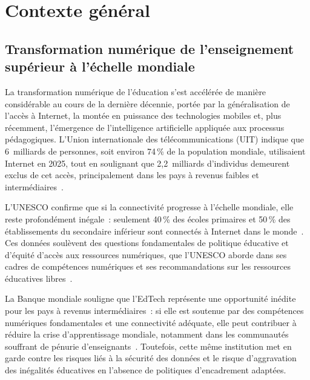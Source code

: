\section{Contexte g\'en\'eral}
\label{sec:contexte}

\subsection{Transformation num\'erique de l'enseignement sup\'erieur \`a l'\'echelle mondiale}

La transformation num\'erique de l'\'education s'est acc\'el\'er\'ee de mani\`ere consid\'erable au cours de la derni\`ere d\'ecennie, port\'ee par la g\'en\'eralisation de l'acc\`es \`a Internet, la mont\'ee en puissance des technologies mobiles et, plus r\'ecemment, l'\'emergence de l'intelligence artificielle appliqu\'ee aux processus p\'edagogiques. L'Union internationale des t\'el\'ecommunications (UIT) indique que 6~milliards de personnes, soit environ 74\,\% de la population mondiale, utilisaient Internet en 2025, tout en soulignant que 2,2~milliards d'individus demeurent exclus de cet acc\`es, principalement dans les pays \`a revenus faibles et interm\'ediaires~\cite{itu_facts_2025}.

L'UNESCO confirme que si la connectivit\'e progresse \`a l'\'echelle mondiale, elle reste profond\'ement in\'egale~: seulement 40\,\% des \'ecoles primaires et 50\,\% des \'etablissements du secondaire inf\'erieur sont connect\'es \`a Internet dans le monde~\cite{unesco_gem_2023}. Ces donn\'ees soul\`event des questions fondamentales de politique \'educative et d'\'equit\'e d'acc\`es aux ressources num\'eriques, que l'UNESCO aborde dans ses cadres de comp\'etences num\'eriques et ses recommandations sur les ressources \'educatives libres~\cite{unesco_oer_2019,unesco_digital_2026}.

La Banque mondiale souligne que l'EdTech repr\'esente une opportunit\'e in\'edite pour les pays \`a revenus interm\'ediaires~: si elle est soutenue par des comp\'etences num\'eriques fondamentales et une connectivit\'e ad\'equate, elle peut contribuer \`a r\'eduire la crise d'apprentissage mondiale, notamment dans les communaut\'es souffrant de p\'enurie d'enseignants~\cite{worldbank_edtech_2026}. Toutefois, cette m\^eme institution met en garde contre les risques li\'es \`a la s\'ecurit\'e des donn\'ees et le risque d'aggravation des in\'egalit\'es \'educatives en l'absence de politiques d'encadrement adapt\'ees.

